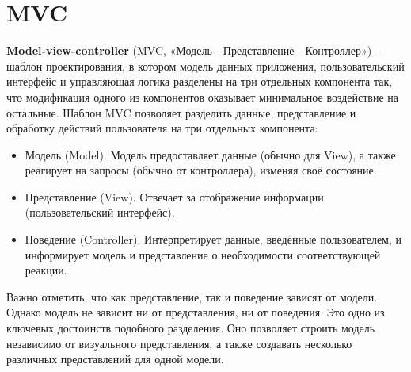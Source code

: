 ﻿\section{MVC}

\textbf{Model-view-controller} (MVC, «Модель - Представление - Контроллер») -- шаблон проектирования, в котором модель данных приложения, пользовательский интерфейс и управляющая логика разделены на три отдельных компонента так, что модификация одного из компонентов оказывает минимальное воздействие на остальные. Шаблон MVC позволяет разделить данные, представление и обработку действий пользователя на три отдельных компонента:

\begin{itemize}
\item Модель (Model). Модель предоставляет данные (обычно для View), а также реагирует на запросы (обычно от контроллера), изменяя своё состояние.
\item Представление (View). Отвечает за отображение информации (пользовательский интерфейс).
\item Поведение (Controller). Интерпретирует данные, введённые пользователем, и информирует модель и представление о необходимости соответствующей реакции.
\end{itemize}

Важно отметить, что как представление, так и поведение зависят от модели. Однако модель не зависит ни от представления, ни от поведения. Это одно из ключевых достоинств подобного разделения. Оно позволяет строить модель независимо от визуального представления, а также создавать несколько различных представлений для одной модели.

\endinput


